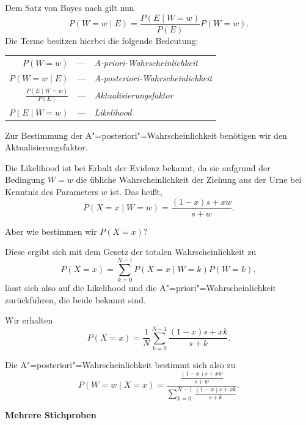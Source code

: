 \documentclass[8pt]{beamer}
\newcommand{\strong}[1]{\textsf{\textbf{#1}}}
\newcommand{\parspace}{\vspace{0.8em}}
\newcommand{\centerheadline}[1]{%
  \begin{center}\strong{#1}\end{center}}
\begin{document}
\begin{frame}
Dem Satz von Bayes nach gilt nun
\[P(W=w\mid E) = \frac{P(E\mid W=w)}{P(E)}P(W=w).\]\pause
Die Terme besitzen hierbei die folgende Bedeutung:

\parspace
\begin{tabular}{@{\qquad}r@{\;\;}c@{\;\;}l}
$P(W=w)$ & --- & \emph{A-priori-Wahrscheinlichkeit}\\[3pt]
$P(W=w\mid E)$ & --- & \emph{A-posteriori-Wahrscheinlichkeit}\\[3pt]
$\frac{P(E\mid W=w)}{P(E)}$ & --- & \emph{Aktualisierungsfaktor}\\[3pt]
$P(E\mid W=w)$ & --- & \emph{Likelihood}
\end{tabular}\pause

\parspace
Zur Bestimmung der A"=posteriori"=Wahrscheinlichkeit benötigen wir den
Aktualisierungsfaktor.
\end{frame}

\begin{frame}
Die Likelihood ist bei
Erhalt der Evidenz bekannt, da sie aufgrund der Bedingung $W=w$ die
übliche Wahrscheinlichkeit der Ziehung aus der Urne bei Kenntnis
des Parameters $w$ ist. Das heißt,
\[P(X=x\mid W=w) = \frac{(1-x)s+xw}{s+w}.\]
\end{frame}

\begin{frame}
Aber wie bestimmen wir $P(X=x)$?\pause

\parspace
Diese ergibt sich mit dem Gesetz der totalen Wahrscheinlichkeit zu
\[P(X=x) = \sum_{k=0}^{N-1}P(X=x\mid W=k)P(W=k),\]
lässt sich also auf die Likelihood und die A"=priori"=Wahrscheinlichkeit
zurückführen, die beide bekannt sind.\pause

\parspace
Wir erhalten
\[P(X=x) = \frac{1}{N}\sum_{k=0}^{N-1}\frac{(1-x)s+xk}{s+k}.\]
\end{frame}

\begin{frame}
Die A"=posteriori"=Wahrscheinlichkeit bestimmt sich also zu
\[P(W=w\mid X=x) = \frac{\frac{(1-x)s+xw}{s+w}}{\sum_{k=0}^{N-1}\frac{(1-x)s+xk}{s+k}}.\]
\end{frame}

\begin{frame}
\centerheadline{Mehrere Stichproben}
\end{frame}
\end{document}
